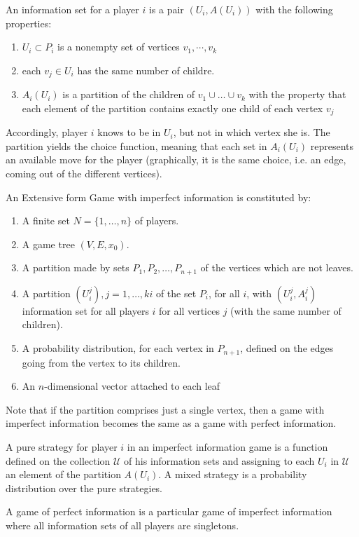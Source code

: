 \begin{definition}
    An information set for a player $i$ is a pair $(U_i, A(U_i))$ with the following properties:
    \begin{enumerate}
        \item $U_i \subset P_i$ is a nonempty set of vertices $v_1, \cdots, v_k$
        \item each $v_j\in U_i$ has the same number of childre. 
        \item $A_i(U_i)$ is a partition of the children of $v_1 \cup \dots \cup v_k$ with the property that each element of the partition contains exactly one child of each vertex $v_j$
    \end{enumerate}
\end{definition}
Accordingly, player $i$ knows to be in $U_i$, but not in which vertex she is.
The partition yields the choice function, meaning that each set in $A_i(U_i)$ represents an available move for the player (graphically, it is the same choice, i.e. an edge, coming out of the different vertices).
\begin{definition}
    An Extensive form Game with imperfect information is constituted by: 
    \begin{enumerate}
        \item A finite set $N = \{1, \dots, n\}$ of players. 
        \item A game tree $(V, E, x_0)$. 
        \item A partition made by sets $P_1, P_2, \dots, P_{n+1}$ of the vertices which are not leaves.
        \item A partition $(U^j_i), j = 1, \dots, ki$ of the set $P_i$, for all $i$, with $(U^j_i, A^j_i)$ information set for all players $i$ for all vertices $j$ (with the same number of children). 
        \item A probability distribution, for each vertex in $P_{n+1}$, defined on the edges going from the vertex to its children. 
        \item An $n$-dimensional vector attached to each leaf
    \end{enumerate}
\end{definition}
Note that if the partition comprises just a single vertex, then a game with imperfect information becomes the same as a game with perfect information.
\begin{definition}
    A pure strategy for player $i$ in an imperfect information game is a function defined on the collection $\mathcal{U}$ of his information sets and assigning to each $U_i$ in $\mathcal{U}$ an element of the partition $A(U_i)$. 
    A mixed strategy is a probability distribution over the pure strategies.
\end{definition}
A game of perfect information is a particular game of imperfect information where all information sets of all players are singletons.
